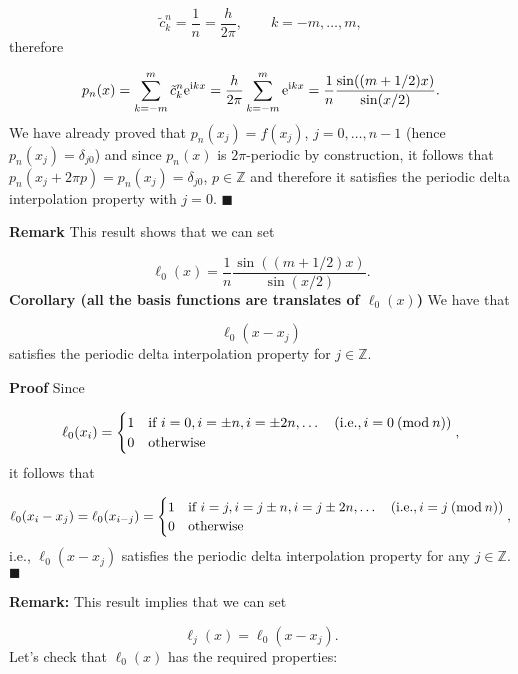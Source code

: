 \documentclass[12pt,a4paper]{article}
\begin{document}
\[
\tilde{c}^n_{k} = \frac{1}{n} = \frac{h}{2\pi}, \qquad  k = -m, \ldots, m,
\]
therefore

\[
p_n(x) = \sum_{k=-m}^{m} \tilde{c}^n_k{\rm e}^{{\rm i}kx} = \frac{h}{2\pi}\sum_{k=-m}^{m} {\rm e}^{{\rm i}kx} = \frac{1}{n}\frac{\sin((m+1/2)x)}{\sin(x/2)}.
\]
We have already proved that $p_n(x_j) = f(x_j)$, $j = 0, \ldots, n-1$ (hence $p_n(x_j) = \delta_{j0}$) and since $p_n(x)$ is $2\pi$-periodic by construction, it follows that $p_n(x_j + 2\pi p) = p_n(x_j) = \delta_{j0}$, $p \in \mathbb{Z}$ and therefore it satisfies the periodic delta interpolation property with $j = 0$.    $\blacksquare$

\textbf{Remark} This result shows that we can set 

\[
\ell_0(x) = \frac{1}{n}\frac{\sin((m+1/2)x)}{\sin(x/2)}.
\]
\textbf{Corollary (all the basis functions are translates of $\ell_0(x)$)} We have that

\[
\ell_0(x - x_j)
\]
satisfies the periodic delta interpolation property for $j \in \mathbb{Z}$.

\textbf{Proof} Since

\[
\ell_{0}(x_i) = \begin{cases}
1 & \text{if } i = 0, i =  \pm n, i = \pm 2n, \ldots \quad (\text{i.e.}, i = 0\: ({\rm mod}\: n))  \\
0 & \text{otherwise } 
\end{cases},
\]
it follows that

\[
\ell_{0}(x_i - x_j) = \ell_{0}(x_{i-j})  =  \begin{cases}
1 & \text{if } i = j, i = j \pm n, i = j\pm 2n, \ldots \quad (\text{i.e.}, i = j\: ({\rm mod}\: n))  \\
0 & \text{otherwise } 
\end{cases},
\]
i.e., $\ell_{0}(x - x_j)$ satisfies the periodic delta interpolation property for any $j \in \mathbb{Z}$.  $\blacksquare$

\textbf{Remark:} This result implies that we can set

\[
\ell_j(x) = \ell_0(x - x_j).
\]
Let's check that $\ell_0(x)$ has the required properties:
\end{document}
